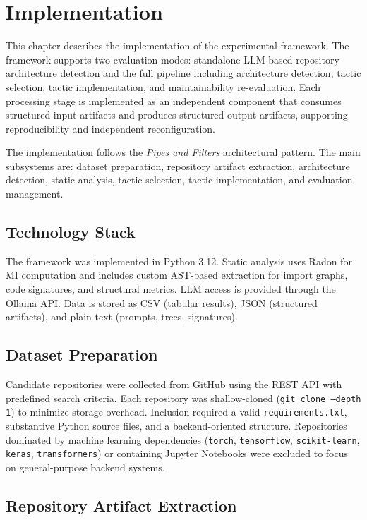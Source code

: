 \chapter{Implementation}
\label{chap:impl}

This chapter describes the implementation of the experimental framework. The framework supports two evaluation modes: standalone LLM-based repository architecture detection and the full pipeline including architecture detection, tactic selection, tactic implementation, and maintainability re-evaluation. Each processing stage is implemented as an independent component that consumes structured input artifacts and produces structured output artifacts, supporting reproducibility and independent reconfiguration.

The implementation follows the \textit{Pipes and Filters} architectural pattern. The main subsystems are: dataset preparation, repository artifact extraction, architecture detection, static analysis, tactic selection, tactic implementation, and evaluation management.

\section{Technology Stack}

The framework was implemented in Python 3.12. Static analysis uses Radon for MI computation and includes custom AST-based extraction for import graphs, code signatures, and structural metrics. LLM access is provided through the Ollama API. Data is stored as CSV (tabular results), JSON (structured artifacts), and plain text (prompts, trees, signatures).

\section{Dataset Preparation}

Candidate repositories were collected from GitHub using the REST API with predefined search criteria. Each repository was shallow-cloned (\texttt{git clone --depth 1}) to minimize storage overhead. Inclusion required a valid \texttt{requirements.txt}, substantive Python source files, and a backend-oriented structure. Repositories dominated by machine learning dependencies (\texttt{torch}, \texttt{tensorflow}, \texttt{scikit-learn}, \texttt{keras}, \texttt{transformers}) or containing Jupyter Notebooks were excluded to focus on general-purpose backend systems.

\section{Repository Artifact Extraction}

